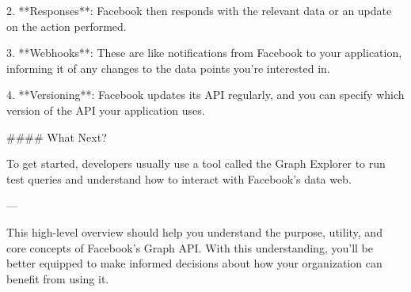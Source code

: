 2. **Responses**: Facebook then responds with the relevant data or an update on the action performed.
  
3. **Webhooks**: These are like notifications from Facebook to your application, informing it of any changes to the data points you're interested in.
  
4. **Versioning**: Facebook updates its API regularly, and you can specify which version of the API your application uses.

#### What Next?

To get started, developers usually use a tool called the Graph Explorer to run test queries and understand how to interact with Facebook's data web.

---

This high-level overview should help you understand the purpose, utility, and core concepts of Facebook's Graph API. With this understanding, you'll be better equipped to make informed decisions about how your organization can benefit from using it.